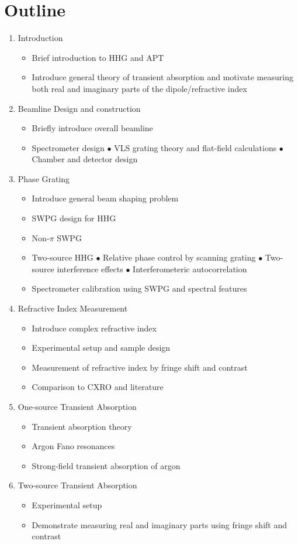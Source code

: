 \chapter{Outline}

\begin{enumerate}
	\item Introduction
	\begin{itemize}
		\item Brief introduction to HHG and APT
		\item Introduce general theory of transient absorption and motivate measuring both real and imaginary parts of the dipole/refractive index
	\end{itemize}
	\item Beamline Design and construction
	\begin{itemize}
		\item Briefly introduce overall beamline
		\item Spectrometer design
			\subitem $\bullet$ VLS grating theory and flat-field calculations
			\subitem $\bullet$ Chamber and detector design
	\end{itemize}
	\item Phase Grating
	\begin{itemize}
		\item Introduce general beam shaping problem
		\item SWPG design for HHG
		\item Non-$\pi$ SWPG
		\item Two-source HHG
			\subitem $\bullet$ Relative phase control by scanning grating
			\subitem $\bullet$ Two-source interference effects
			\subitem $\bullet$ Interferometeric autocorrelation
		\item Spectrometer calibration using SWPG and spectral features
	\end{itemize}
	\item Refractive Index Measurement
	\begin{itemize}
		\item Introduce complex refractive index
		\item Experimental setup and sample design
		\item Measurement of refractive index by fringe shift and contrast
		\item Comparison to CXRO and literature
	\end{itemize}
	\item One-source Transient Absorption
	\begin{itemize}
		\item Transient absorption theory
		\item Argon Fano resonances
		\item Strong-field transient absorption of argon
	\end{itemize}
	\item Two-source Transient Absorption
	\begin{itemize}
		\item Experimental setup
		\item Demonstrate measuring real and imaginary parts using fringe shift and contrast
	\end{itemize}
\end{enumerate}
